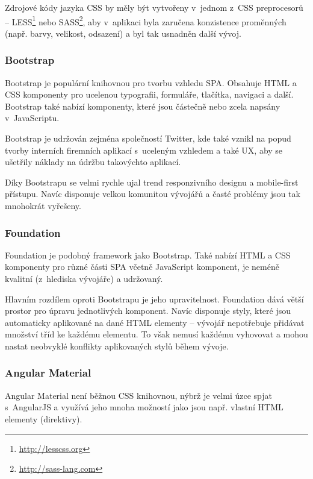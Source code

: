 Zdrojové kódy jazyka CSS by měly být vytvořeny v~jednom z~CSS preprocesorů~\cite{css:preproc} -- LESS\footnote{\url{http://lesscss.org}} nebo SASS\footnote{\url{http://sass-lang.com}}, aby v~aplikaci byla zaručena konzistence proměnných (např. barvy, velikost, odsazení) a byl tak usnadněn další vývoj.

\subsubsection*{Bootstrap}

Bootstrap je populární knihovnou pro tvorbu vzhledu SPA. Obsahuje HTML a CSS komponenty pro ucelenou typografii, formuláře, tlačítka, navigaci a další. Bootstrap také nabízí komponenty, které jsou částečně nebo zcela napsány v~JavaScriptu.

Bootstrap je udržován zejména společností Twitter, kde také vznikl na popud tvorby interních firemních aplikací s~uceleným vzhledem a také UX, aby se ušetřily náklady na údržbu takovýchto aplikací.

Díky Bootstrapu se velmi rychle ujal trend responzivního designu a mobile-first přístupu. Navíc disponuje velkou komunitou vývojářů a časté problémy jsou tak mnohokrát vyřešeny.

\subsubsection*{Foundation}

Foundation je podobný framework jako Bootstrap. Také nabízí HTML a CSS komponenty pro různé části SPA včetně JavaScript komponent, je neméně kvalitní (z~hlediska vývojáře) a udržovaný.

Hlavním rozdílem oproti Bootstrapu je jeho upravitelnost. Foundation dává větší prostor pro úpravu jednotlivých komponent. Navíc disponuje styly, které jsou automaticky aplikované na dané HTML elementy -- vývojář nepotřebuje přidávat množství tříd ke každému elementu. To však nemusí každému vyhovovat a mohou nastat neobvyklé konflikty aplikovaných stylů během vývoje.

\subsubsection*{Angular Material}

Angular Material není běžnou CSS knihovnou, nýbrž je velmi úzce spjat s~AngularJS a využívá jeho mnoha možností jako jsou např. vlastní HTML elementy (direktivy).

